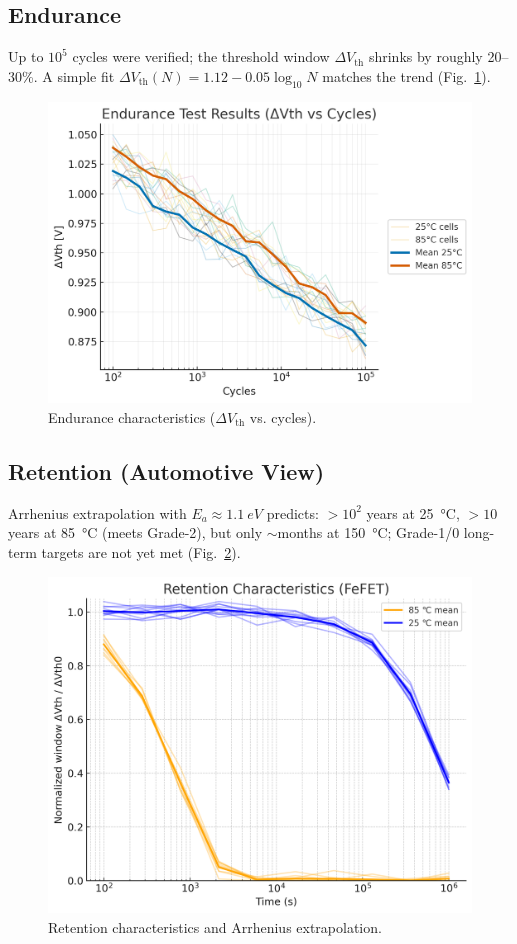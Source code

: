 \documentclass[conference]{IEEEtran}
\begin{document}
\subsection{Endurance}
Up to \(10^{5}\) cycles were verified; the threshold window \(\Delta V_{\mathrm{th}}\) shrinks by roughly 20--30\%.  
A simple fit \(\Delta V_{\mathrm{th}}(N)=1.12-0.05\log_{10}N\) matches the trend (Fig.~\ref{fig:endurance}).
\begin{figure}[t]\centering
  \includegraphics[width=\linewidth]{fig5_endurance.png}
  \caption{Endurance characteristics (\(\Delta V_{\mathrm{th}}\) vs. cycles).}
  \label{fig:endurance}
\end{figure}

\subsection{Retention (Automotive View)}
Arrhenius extrapolation with \(E_a\approx\SI{1.1}{eV}\) predicts:
\(>\!10^{2}\) years at \SI{25}{\celsius}, \(>\!10\) years at \SI{85}{\celsius} (meets Grade-2), but only \(\sim\)months at \SI{150}{\celsius}; Grade-1/0 long-term targets are not yet met (Fig.~\ref{fig:retention}).
\begin{figure}[t]\centering
  \includegraphics[width=\linewidth]{fig6_retention.png}
  \caption{Retention characteristics and Arrhenius extrapolation.}
  \label{fig:retention}
\end{figure}
\end{document}
